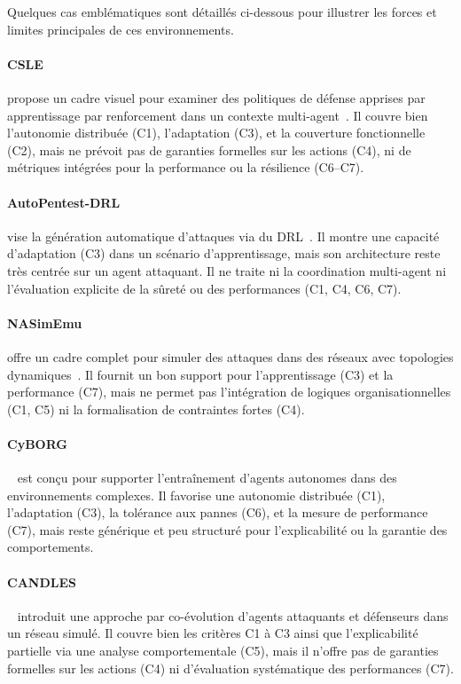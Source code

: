 Quelques cas emblématiques sont détaillés ci-dessous pour illustrer les forces et limites principales de ces environnements.

\paragraph{CSLE} propose un cadre visuel pour examiner des politiques de défense apprises par apprentissage par renforcement dans un contexte multi-agent~\cite{hammar_stadler_noms_22}. Il couvre bien l’autonomie distribuée (C1), l’adaptation (C3), et la couverture fonctionnelle (C2), mais ne prévoit pas de garanties formelles sur les actions (C4), ni de métriques intégrées pour la performance ou la résilience (C6–C7).

\paragraph{AutoPentest-DRL} vise la génération automatique d’attaques via du DRL~\cite{CROND}. Il montre une capacité d’adaptation (C3) dans un scénario d’apprentissage, mais son architecture reste très centrée sur un agent attaquant. Il ne traite ni la coordination multi-agent ni l’évaluation explicite de la sûreté ou des performances (C1, C4, C6, C7).

\paragraph{NASimEmu} offre un cadre complet pour simuler des attaques dans des réseaux avec topologies dynamiques~\cite{janisch2023nasimemu}. Il fournit un bon support pour l’apprentissage (C3) et la performance (C7), mais ne permet pas l’intégration de logiques organisationnelles (C1, C5) ni la formalisation de contraintes fortes (C4).

\paragraph{CyBORG}~\cite{standen2021cyborg} est conçu pour supporter l'entraînement d'agents autonomes dans des environnements complexes. Il favorise une autonomie distribuée (C1), l’adaptation (C3), la tolérance aux pannes (C6), et la mesure de performance (C7), mais reste générique et peu structuré pour l'explicabilité ou la garantie des comportements.

\paragraph{CANDLES}~\cite{10.1145/2739482.2768429} introduit une approche par co-évolution d’agents attaquants et défenseurs dans un réseau simulé. Il couvre bien les critères C1 à C3 ainsi que l’explicabilité partielle via une analyse comportementale (C5), mais il n’offre pas de garanties formelles sur les actions (C4) ni d’évaluation systématique des performances (C7).

